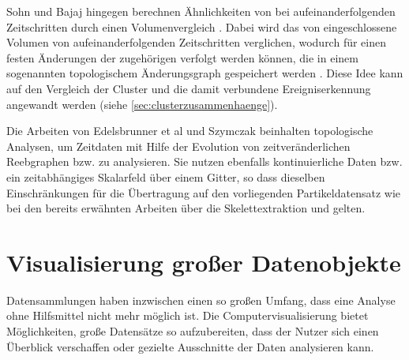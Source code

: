 Sohn und Bajaj hingegen berechnen Ähnlichkeiten von  bei aufeinanderfolgenden Zeitschritten durch einen Volumenvergleich \cite{silver1997trackingTurbulent3DFeatures}. Dabei wird das von  eingeschlossene Volumen von aufeinanderfolgenden Zeitschritten verglichen, wodurch für einen festen  Änderungen der zugehörigen  verfolgt werden können, die in einem sogenannten topologischem Änderungsgraph gespeichert werden \cite{sohn2006timeVaryingContourTopology}. Diese Idee kann auf den Vergleich der Cluster und die damit verbundene Ereigniserkennung angewandt werden (siehe \autoref{sec:clusterzusammenhaenge}).

Die Arbeiten von Edelsbrunner et al \cite{edelsbrunner2004timeVaryingReebGraphs} und Szymczak \cite{szymczak2005contourEvolutionInTimeDependentScalarFields} beinhalten topologische Analysen, um Zeitdaten mit Hilfe der Evolution von zeitveränderlichen Reebgraphen bzw.  zu analysieren. Sie nutzen ebenfalls kontinuierliche Daten bzw. ein zeitabhängiges Skalarfeld über einem Gitter, so dass dieselben Einschränkungen für die Übertragung auf den vorliegenden Partikeldatensatz wie bei den bereits erwähnten Arbeiten über die Skelettextraktion und  gelten.

\section{Visualisierung großer Datenobjekte}\label{sec:related-vis}


Datensammlungen haben inzwischen einen so großen Umfang, dass eine Analyse ohne Hilfsmittel nicht mehr möglich ist. Die Computervisualisierung bietet Möglichkeiten, große Datensätze so aufzubereiten, dass der Nutzer sich einen Überblick verschaffen oder gezielte Ausschnitte der Daten analysieren kann.

